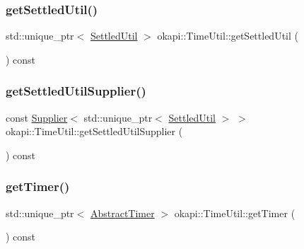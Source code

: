 \mbox{\label{classokapi_1_1TimeUtil_afd0b2bd0d14401b7284ec08d9fce2e77}} 
\subsubsection{\texorpdfstring{getSettledUtil()}{getSettledUtil()}}
{\footnotesize\ttfamily std\+::unique\+\_\+ptr$<$ \mbox{\hyperlink{classokapi_1_1SettledUtil}{Settled\+Util}} $>$ okapi\+::\+Time\+Util\+::get\+Settled\+Util (\begin{DoxyParamCaption}{ }\end{DoxyParamCaption}) const}

\mbox{\label{classokapi_1_1TimeUtil_a542fb3e832626bdd55a7c7abd471d218}} 
\subsubsection{\texorpdfstring{getSettledUtilSupplier()}{getSettledUtilSupplier()}}
{\footnotesize\ttfamily const \mbox{\hyperlink{classokapi_1_1Supplier}{Supplier}}$<$ std\+::unique\+\_\+ptr$<$ \mbox{\hyperlink{classokapi_1_1SettledUtil}{Settled\+Util}} $>$ $>$ okapi\+::\+Time\+Util\+::get\+Settled\+Util\+Supplier (\begin{DoxyParamCaption}{ }\end{DoxyParamCaption}) const}

\mbox{\label{classokapi_1_1TimeUtil_ad0c80313a31b0c43543fb470678f7ace}} 
\subsubsection{\texorpdfstring{getTimer()}{getTimer()}}
{\footnotesize\ttfamily std\+::unique\+\_\+ptr$<$ \mbox{\hyperlink{classokapi_1_1AbstractTimer}{Abstract\+Timer}} $>$ okapi\+::\+Time\+Util\+::get\+Timer (\begin{DoxyParamCaption}{ }\end{DoxyParamCaption}) const}

